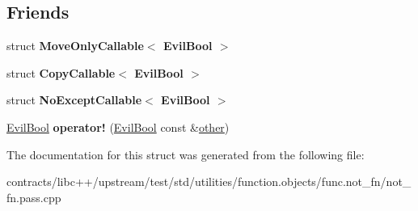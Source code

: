 \subsection*{Friends}
\begin{DoxyCompactItemize}
\item 
\mbox{\label{struct_evil_bool_a91a1b071f43f5c0a74a30040d15f78b7}} 
struct {\bfseries Move\+Only\+Callable$<$ Evil\+Bool $>$}
\item 
\mbox{\label{struct_evil_bool_a8e9f0aba5d456774b3ffaaea65557214}} 
struct {\bfseries Copy\+Callable$<$ Evil\+Bool $>$}
\item 
\mbox{\label{struct_evil_bool_ae9f45166f587bb8cc470377269207594}} 
struct {\bfseries No\+Except\+Callable$<$ Evil\+Bool $>$}
\item 
\mbox{\label{struct_evil_bool_a03e775cc400a305747ddae2f19726cef}} 
\mbox{\hyperlink{struct_evil_bool}{Evil\+Bool}} {\bfseries operator!} (\mbox{\hyperlink{struct_evil_bool}{Evil\+Bool}} const \&\mbox{\hyperlink{structother}{other}})
\end{DoxyCompactItemize}


The documentation for this struct was generated from the following file\+:\begin{DoxyCompactItemize}
\item 
contracts/libc++/upstream/test/std/utilities/function.\+objects/func.\+not\+\_\+fn/not\+\_\+fn.\+pass.\+cpp\end{DoxyCompactItemize}
